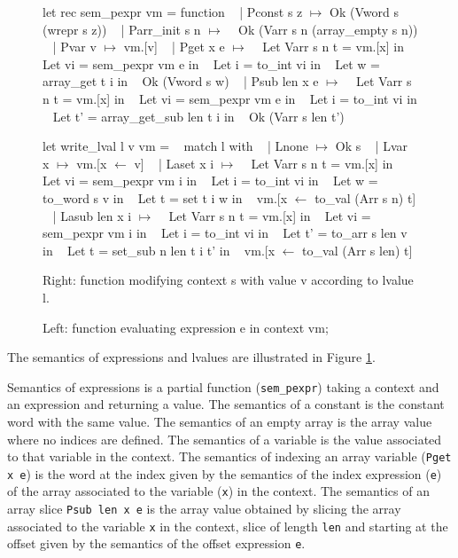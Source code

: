 \documentclass{article}
\begin{document}
\begin{figure}[t]
\obeylines\obeyspaces\ttfamily%
\begin{minipage}{0.52\textwidth}
let rec sem\_pexpr vm = function
~ | Pconst s z \(\mapsto\) Ok (Vword s (wrepr s z))
~ | Parr\_init s n \(\mapsto\)
~   Ok (Varr s n (array\_empty s n))
~ | Pvar v \(\mapsto\) vm.[v]
~ | Pget x e \(\mapsto\)
~   Let Varr s n t = vm.[x] in
~   Let vi = sem\_pexpr vm e in
~   Let i = to\_int vi in
~   Let w = array\_get t i in
~   Ok (Vword s w)
~ | Psub len x e \(\mapsto\)
~   Let Varr s n t = vm.[x] in
~   Let vi = sem\_pexpr vm e in
~   Let i = to\_int vi in
~   Let t' = array\_get\_sub len t i in
~   Ok (Varr s len t')
\end{minipage}\hfill\vline\hfill\begin{minipage}{0.45\textwidth}
let write\_lval l v vm =
~ match l with
~ | Lnone \(\mapsto\) Ok s
~ | Lvar x \(\mapsto\) vm.[x \(\leftarrow\) v]
~ | Laset x i \(\mapsto\)
~   Let Varr s n t = vm.[x] in
~   Let vi = sem\_pexpr vm i in
~   Let i = to\_int vi in
~   Let w = to\_word s v in
~   Let t = set t i w in
~   vm.[x \(\leftarrow\) to\_val (Arr s n) t]
~ | Lasub len x i \(\mapsto\)
~   Let Varr s n t = vm.[x] in
~   Let vi = sem\_pexpr vm i in
~   Let i = to\_int vi in
~   Let t' = to\_arr s len v in 
~   Let t = set\_sub n len t i t' in
~   vm.[x \(\leftarrow\) to\_val (Arr s len) t]
\end{minipage}\normalfont%
\caption{Left: function evaluating expression e in context vm;}\vspace{-0.8\baselineskip}\center
Right: function modifying context s with value v according to lvalue l.\label{fig:semelv}
\end{figure}

The semantics of expressions and lvalues are illustrated in Figure
\ref{fig:semelv}.

Semantics of expressions is a partial function (\texttt{sem\_pexpr}) taking a
context and an expression and returning a value. The semantics of a constant is
the constant word with the same value. The semantics of an empty array is the
array value where no indices are defined. The semantics of a variable is the
value associated to that variable in the context. The semantics of indexing an
array variable (\texttt{Pget x e}) is the word at the index given by the
semantics of the index expression (\texttt{e}) of the array associated to the
variable (\texttt{x}) in the context. The semantics of an array slice
\texttt{Psub len x e} is the array value obtained by slicing the array
associated to the variable \texttt{x} in the context, slice of length
\texttt{len} and starting at the offset given by the semantics of the offset
expression \texttt{e}.
\end{document}
